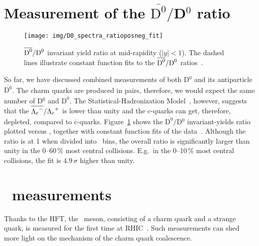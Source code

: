 \section{Measurement of the $\overline{\text{D}^0}/$D$^0$ ratio}

\begin{figure}[!htb]
\begin{center}
 \texttt{[image: img/D0\_spectra\_ratioposneg\_fit]}\\
\end{center}
\caption[$\overline{\dzero}/\dzero$ invariant yield ratio at mid-rapidity ($|y| < 1$).]{\label{dzeroRatio}$\overline{\dzero}/\dzero$ invariant yield ratio at mid-rapidity ($|y| < 1$). The dashed lines illustrate constant function fits to the $\overline{\dzero}/\dzero$ ratios~\cite{D0paper}.}
\end{figure}

So far, we have discussed combined measurements of both D$^0$ and its antiparticle $\overline{\text{D}^0}$\@. The charm quarks are produced in pairs, therefore, we would expect the same number of D$^0$ and $\overline{\text{D}^0}$\@. The Statistical-Hadronization Model~\cite{SHM_LcRatio}, however, suggests that the $\overline{{\Lambda_\text{c}}^-}/{\Lambda_\text{c}}^+$ is lower than unity and the c-quarks can get, therefore, depleted, compared to $\overline{\text{c}}$-quarks. Figure~\ref{dzeroRatio} shows the $\overline{\text{D}^0}/$D$^0$ invariant-yields ratio plotted versus \pt, together with constant function fits of the data~\cite{D0paper}\@.  Although the ratio is at 1 when divided into \pt\ bins, the overall ratio is significantly larger than unity in the 0--60$\,\%$ most central collisions. E.g.\ in the 0--10$\,\%$ most central collisions, the fit is $4.9\,\sigma$ higher than unity.



\section{\Ds\ measurements}

Thanks to the HFT, the \Ds\ meson, consisting of a charm quark and a strange quark,
is measured for the first time at RHIC~\cite{DsPaper}\@. Such measurements can
shed more light on the mechanism of the charm quark coalescence.

